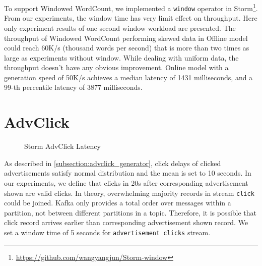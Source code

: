 To support Windowed WordCount, we implemented a \texttt{window} operator in Storm\footnote{\url{https://github.com/wangyangjun/Storm-window}}. From our experiments, the window time has very limit effect on throughput. Here only experiment results of one second window workload are presented. The throughput of Windowed WordCount performing skewed data in Offline model could reach 60K/s (thousand words per second) that is more than two times as large as experiments without window. While dealing with uniform data, the throughput doesn't have any obvious improvement. Online model with a generation speed of 50K/s achieves a median latency of 1431 milliseconds, and a 99-th percentile latency of 3877 milliseconds.


\section{AdvClick}

\begin{figure}
  \begin{center}
   \caption{Storm AdvClick Latency}
   \label{fig:storm_adv_click}
  \end{center}
\end{figure}

As described in \cref{subsection:advclick_generator}, click delays of clicked advertisements satisfy normal distribution and the mean is set to 10 seconds. In our experiments, we define that clicks in 20s after corresponding advertisement shown are valid clicks. In theory, overwhelming majority records in stream \texttt{click} could be joined. Kafka only provides a total order over messages within a partition, not between different partitions in a topic\cite{Kafka}. Therefore, it is possible that click record arrives earlier than corresponding advertisement shown record. We set a window time of 5 seconds for \texttt{advertisement clicks} stream.

